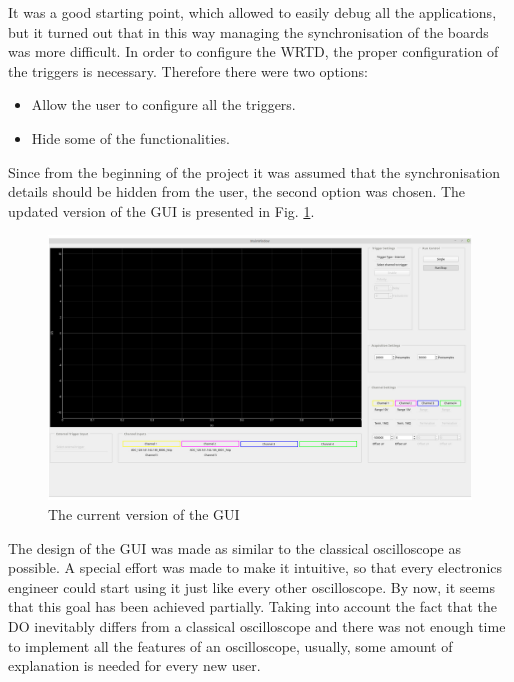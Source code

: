         It was a good starting point, which allowed to easily debug all the applications, but it turned out that in this way managing the synchronisation of the boards was more difficult. In order to configure the WRTD, the proper configuration of the triggers is necessary. Therefore there were two options:
        \begin{itemize}
            \item Allow the user to configure all the triggers.
            \item Hide some of the functionalities.
        \end{itemize}
        Since from the beginning of the project it was assumed that the synchronisation details should be hidden from the user, the second option was chosen. The updated version of the GUI is presented in Fig. \ref{fig:gui_current}.
        
        \begin{figure}
        	\centerline{\includegraphics[width=\textwidth]{figures/GUI_current.jpg}}
        	\caption{The current version of the GUI}
        	\label{fig:gui_current}
        \end{figure}
        
        The design of the GUI was made as similar to the classical oscilloscope as possible. A special effort was made to make it intuitive, so that every electronics engineer could start using it just like every other oscilloscope.
        By now, it seems that this goal has been achieved partially. Taking into account the fact that the DO inevitably differs from a classical oscilloscope and there was not enough time to implement all the features of an oscilloscope, usually, some amount of explanation is needed for every new user.
        
